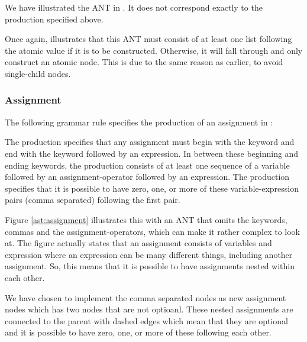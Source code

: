 \begin{ebnf}
\end{ebnf}

We have illustrated the ANT in . It does not correspond
exactly to the production specified above.




Once again,  illustrates that this ANT must consist of
at least one list following the atomic value if it is to be constructed.
Otherwise, it will fall through and only construct an atomic node. This is due
to the same reason as earlier, to avoid single-child nodes.

\subsubsection{Assignment}
The following grammar rule specifies the production of an assignment in
\productname{}:

\begin{ebnf}
\end{ebnf}

The production specifies that any assignment must begin with the keyword
 and end with the keyword  followed by an expression. In
between these beginning and ending keywords, the production consists of at least
one sequence of a variable followed by an assignment-operator followed by an
expression. The production specifies that it is possible to have zero, one, or
more of these variable-expression pairs (comma separated) following the first
pair.



Figure \ref{ast:assignment} illustrates this with an ANT that omits the
keywords, commas and the assignment-operators, which can make it rather complex
to look at. The figure actually states that an assignment consists of variables
and expression where an expression can be many different things, including
another assignment. So, this means that it is possible to have assignments
nested within each other. 

We have chosen to implement the comma separated nodes as new assignment nodes
which has two nodes that are not optioanl. These nested assignments are
connected to the parent with dashed edges which mean that they are optional and
it is possible to have zero, one, or more of these following each other.

